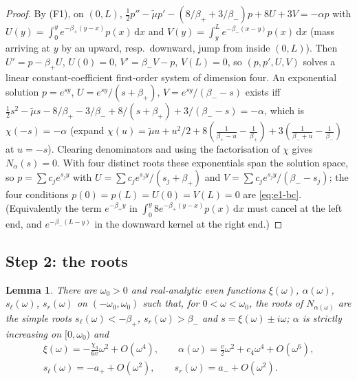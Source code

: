 \documentclass[11pt,a4paper]{article}
\newtheorem{lemma}[theorem]{Lemma}
\theoremstyle{definition}
\theoremstyle{remark}
\newcommand{\1}{\mathbf 1}
\newcommand{\dd}{\,\mathrm d}
\begin{document}
\begin{proof}
By (F1), on $(0,L)$,
$\tfrac12p''-\tilde\mu p'-(8/\beta_++3/\beta_-)p+8U+3V=-\alpha p$ with
$U(y)=\int_0^ye^{-\beta_+(y-x)}p(x)\dd x$ and $V(y)=\int_y^Le^{-\beta_-(x-y)}p(x)\dd x$
(mass arriving at $y$ by an upward, resp.\ downward, jump from inside $(0,L)$).
Then $U'=p-\beta_+U$, $U(0)=0$, $V'=\beta_-V-p$, $V(L)=0$, so $(p,p',U,V)$ solves a
linear constant-coefficient first-order system of dimension four. An exponential
solution $p=e^{sy}$, $U=e^{sy}/(s+\beta_+)$, $V=e^{sy}/(\beta_--s)$ exists iff
$\tfrac12s^2-\tilde\mu s-8/\beta_+-3/\beta_-+8/(s+\beta_+)+3/(\beta_--s)=-\alpha$, which is
$\chi(-s)=-\alpha$ (expand $\chi(u)=\tilde\mu u+u^2/2+8(\frac1{\beta_+-u}-\frac1{\beta_+})
+3(\frac1{\beta_-+u}-\frac1{\beta_-})$ at $u=-s$). Clearing denominators and using the
factorisation of $\chi$ gives $N_\alpha(s)=0$. With four distinct roots these
exponentials span the solution space, so $p=\sum c_je^{s_jy}$ with
$U=\sum c_je^{s_jy}/(s_j+\beta_+)$ and $V=\sum c_je^{s_jy}/(\beta_--s_j)$; the four
conditions $p(0)=p(L)=U(0)=V(L)=0$ are \eqref{eq:e1-bc}. (Equivalently the term
$e^{-\beta_+y}$ in $\int_0^y8e^{-\beta_+(y-x)}p(x)\dd x$ must cancel at the left end, and
$e^{-\beta_-(L-y)}$ in the downward kernel at the right end.)
\end{proof}

\subsection*{Step 2: the roots}

\begin{lemma}\label{lem:e1-roots}
There are $\omega_0>0$ and real-analytic \emph{even} functions $\xi(\omega)$,
$\alpha(\omega)$, $s_\ell(\omega)$, $s_r(\omega)$ on $(-\omega_0,\omega_0)$ such that, for
$0<\omega<\omega_0$, the roots of $N_{\alpha(\omega)}$ are the simple roots
$s_\ell(\omega)<-\beta_+$, $s_r(\omega)>\beta_-$ and $s=\xi(\omega)\pm i\omega$; $\alpha$ is
strictly increasing on $[0,\omega_0)$ and
\begin{gather*}
\xi(\omega)=-\frac{\chi_3}{6v}\omega^2+O(\omega^4),\qquad
\alpha(\omega)=\frac v2\omega^2+c_4\omega^4+O(\omega^6),\\
s_\ell(\omega)=-a_++O(\omega^2),\qquad s_r(\omega)=a_-+O(\omega^2).
\end{gather*}
\end{lemma}
\end{document}
